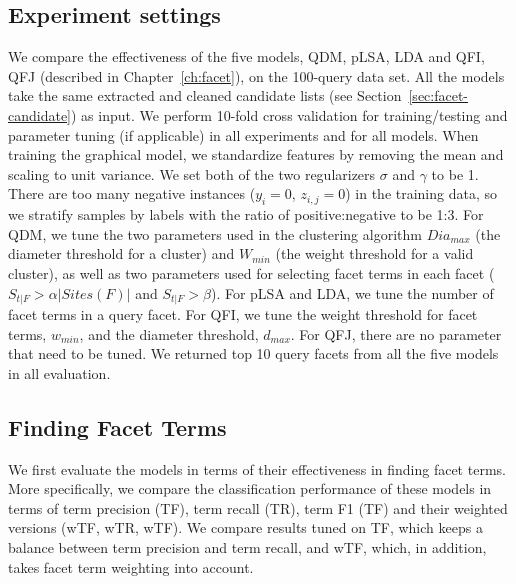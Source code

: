 \subsection{Experiment settings}
We compare the effectiveness of the five models, QDM, pLSA, LDA and QFI, QFJ (described in Chapter~\ref{ch:facet}), on the 100-query data set.
All the models take the same extracted and cleaned candidate lists (see Section~\ref{sec:facet-candidate}) as input.
We perform 10-fold cross validation for training/testing and parameter tuning (if applicable) in all experiments and for all models.
When training the graphical model, we standardize features by removing the mean and scaling to unit variance. 
We set both of the two regularizers $\sigma$ and $\gamma$ to be 1.
There are too many negative instances ($y_i=0$, $z_{i,j}=0$) in the training data, so we stratify samples by labels with the ratio of positive:negative to be 1:3.
For QDM, we tune the two parameters used in the clustering algorithm $Dia_{max}$ (the diameter threshold for a cluster) and $W_{min}$ (the weight threshold for a valid cluster), as well as two parameters used for selecting facet terms in each facet ($S_{t|F} > \alpha |Sites(F)|$ and $S_{t|F}>\beta$).
For pLSA and LDA, we tune the number of facet terms in a query facet.
For QFI, we tune the weight threshold for facet terms, $w_{min}$, and the diameter threshold,  $d_{max}$.
For QFJ, there are no parameter that need to be tuned.
We returned top 10 query facets from all the five models in all evaluation. 
\subsection{Finding Facet Terms}
\label{sec:expt}
We first evaluate the models in terms of their effectiveness in finding facet terms. More specifically, we compare the classification performance of these models in terms of term precision (TF), term recall (TR), term F1 (TF) and their weighted versions (wTF, wTR, wTF). We compare results tuned on TF, which keeps a balance between term precision and term recall, and wTF, which, in addition, takes facet term weighting into account.


